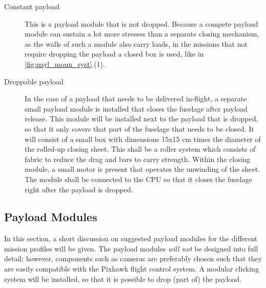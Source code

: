 \begin{description}
    \item[Constant payload] This is a payload module that is not dropped. Because a compete payload module can sustain a lot more stresses than a separate closing mechanism, as the walls of such a module also carry loads, in the missions that not require dropping the payload a closed box is used, like in \autoref{fig:payl_moun_syst}.(1).
    \item[Droppable payload] In the case of a payload that needs to be delivered in-flight, a separate small payload module is installed that closes the fuselage after payload release. This module will be installed next to the payload that is dropped, so that it only covers that part of the fuselage that needs to be closed. It will consist of a small box with dimensions 15x15 cm times the diameter of the rolled-up closing sheet. This shall be a roller system which consists of fabric to reduce the drag and bars to carry strength. Within the closing module, a small motor is present that operates the unwinding of the sheet. The module shall be connected to the CPU so that it closes the fuselage right after the payload is dropped.
\end{description}








\subsection{Payload Modules}
In this section, a short discussion on suggested payload modules for the different mission profiles will be given. The payload modules \textit{will not} be designed into full detail; however, components such as cameras are preferably chosen such that they are easily compatible with the Pixhawk flight control system. A modular clicking system will be installed, so that it is possible to drop (part of) the payload.


